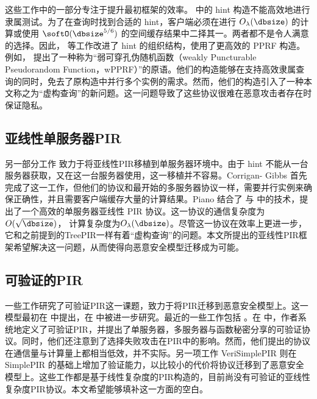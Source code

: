 这些工作中的一部分专注于提升最初框架的效率。\cite{CK20} 中的 hint 构造不能高效地进行隶属测试。为了在查询时找到合适的 hint，客户端必须在进行 $O_\lambda(\dbsize)$ 的计算或使用 $\softO(\dbsize^{5/6})$ 的空间缓存结果中二择其一。两者都不是令人满意的选择。因此，\cite{TreePIR,C:SACM21} 等工作改进了 hint 的组织结构，使用了更高效的 PPRF 构造。例如，\cite{TreePIR} 提出了一种称为“弱可穿孔伪随机函数（weakly Puncturable Pseudorandom Function，wPPRF）”的原语。他们的构造能够在支持高效隶属查询的同时，免去了原构造中并行多个实例的需求。然而，他们的构造引入了一种本文称之为“虚构查询”的新问题。这一问题导致了这些协议很难在恶意攻击者存在时保证隐私。

\subsection{亚线性单服务器PIR}
另一部分工作 \cite{Piano,CHK22} 致力于将亚线性PIR移植到单服务器环境中。由于 hint 不能从一台服务器获取，又在这一台服务器使用，这一移植并不容易。Corrigan-
Gibbs 首先完成了这一工作，但他们的协议和最开始的多服务器协议一样，需要并行实例来确保正确性，并且需要客户端缓存大量的计算结果。Piano \cite{Piano} 结合了 \cite{CHK22} 与 \cite{TreePIR} 中的技术，提出了一个高效的单服务器亚线性 PIR 协议。这一协议的通信复杂度为 $O(\sqrt{\dbsize})$， 计算复杂度为$O_\lambda(\dbsize)$。尽管这一协议在效率上更进一步，它和之前提到的TreePIR一样有着“虚构查询”的问题。本文所提出的亚线性PIR框架希望解决这一问题，从而使得向恶意安全模型迁移成为可能。

\subsection{可验证的PIR}
一些工作研究了可验证PIR这一课题，致力于将PIR迁移到恶意安全模型上。这一模型最初在 \cite{FOCS:CGKS95} 中提出，在 \cite{SCN:BeiSta02, USENIX:DevGolHen12,SVPIR18, MerkleTree} 中被进一步研究。最近的一些工作包括 \cite{VeriSimplePIR, APIR}。在 \cite{APIR} 中，作者系统地定义了可验证PIR，并提出了单服务器，多服务器与函数秘密分享的可验证协议。同时，他们还注意到了选择失败攻击在PIR中的影响。然而，他们提出的协议在通信量与计算量上都相当低效，并不实际。另一项工作 VeriSimplePIR \cite{VeriSimplePIR} 则在 SimplePIR 的基础上增加了验证能力，以比较小的代价将协议迁移到了恶意安全模型上。这些工作都是基于线性复杂度的PIR构造的，目前尚没有可验证的亚线性复杂度PIR协议。本文希望能够填补这一方面的空白。


